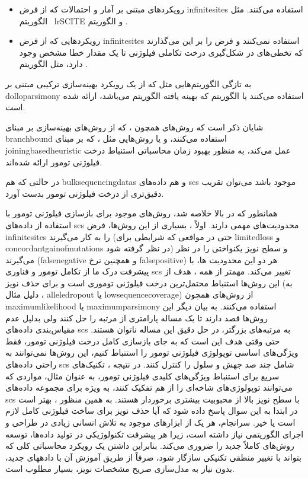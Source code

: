  \begin{itemize}
 	\item رویکردهای مبتنی بر آمار و احتمالات که از فرض \gls{infinitesites}  استفاده می‌کنند. مثل الگوریتم \ lr{SCITE}  \cite{jahn2016tree} و الگوریتم   \cite{ross2016onconem}. 
\item رویکردهایی که از فرض \gls{infinitesites} استفاده نمی‌کنند و فرض را بر این می‌گذارند که تخطی‌های در شکل‌گیری درخت تکاملی فیلوژنی تا یک مقدار خطا مشخص وجود دارد، مثل الگوریتم  \cite{zafar2017sifit}.  
 \end{itemize}


به تازگی الگوریتم‌هایی مثل  که از یک رویکرد بهینه‌سازی ترکیبی مبتنی بر \gls{dolloparsimony} استفاده می‌کنند یا الگوریتم   که بهینه یافته الگوریتم  می‌باشد، ارائه شده است. \cite{el2018sphyr, zafar2019siclonefit}

شایان ذکر است که روش‌های همچون  ، که از روش‌های بهینه‌سازی بر مبنای \gls{branchbound} استفاده می‌کنند، و یا روش‌هایی مثل ، که بر مبنای \gls{joiningbasedheuristic} عمل می‌کند، به منظور بهبود زمان محاسباتی استنباط درخت فیلوژنی تومور ارائه شده‌اند. \cite{sadeqi2020phiscs, wu2020accurate}

در حالتی که هم \glspl{bulksequencingdata} و هم داده‌های \gls{scs} موجود باشد می‌توان تقریب دقیق‌تری از درخت فیلوژنی  تومور بدست آورد. \cite{malikic2019integrative, malikic2019phiscs}

همانطور که در بالا خلاصه شد، روش‌های موجود برای بازسازی فیلوژنی تومور با استفاده از داده‌های \gls{scs} محدودیت‌های مهمی دارند. اولاً ، بسیاری از این روش‌ها، فرض \gls{infinitesites} را به کار می‌گیرند (حتی در مواقعی که شرایطی برای \gls{limitedloss} و \gls{concordantgainofmutations}  در نظر گرفته شود) و سطح نویز یکنواختی را در نظر می‌گیرند (\gls{falsenegative} و همچنین نرخ \gls{falsepositive})  هر دو این محدودیت ها، با پیشرفت درک ما از تکامل تومور و فناوری \gls{scs}  تغییر می‌کند. مهمتر از همه ، هدف از این روش‌ها استنباط محتمل‌ترین درخت فیلوژنی توموری است و برای حذف نویز (به دلیل مثال ، \gls{alleledropout} یا \gls{lowsequencecoverage}) از روش‌های همچون \gls{maximumlikelihood} یا \gls{maximumparsimony} استفاده می‌کنند. به بیان دیگر این روش‌ها قصد دارند تا یک مساله پارامتری از مرتبه  را حل کنند ولی بدلیل  عدم مقیاس‌بندی داده‌های \gls{scs} به مرتبه‌های بزرگتر، در حل دقیق این مساله ناتوان هستند. حتی وقتی هدف این است که به جای بازسازی کامل درخت فیلوژنی تومور، فقط ویژگی‌های اساسی توپولوژی فیلوژنی تومور را استنباط کنیم، این روش‌ها نمی‌توانند به راحتی داده‌های \gls{scs} شامل چند صد جهش و سلول را کنترل کنند. در نتیجه ، تکنیک‌های سریع برای استنباط ویژگی‌های کلیدی فیلوژنی تومور، به عنوان مثال، مواردی که می‌توانند توپولوژی‌های شاخه‌ای را از هم تفکیک کنند، به ویژه برای مجموعه داده‌های \gls{scs} با سطح نویز بالا از محبوبیت بیشتری برخوردار هستند. به همین منظور ، بهتر است در ابتدا به این سوال پاسخ داده شود که آیا حذف نویز  برای ساخت فیلوژنی کامل لازم است یا خیر. سرانجام، هر یک از ابزارهای موجود به تلاش انسانی زیادی در طراحی و اجرای الگوریتمی نیاز داشته است، زیرا هر پیشرفت تکنولوژیکی در تولید داده‌ها، توسعه روش‌های کاملاً جدید را ضروری می‌کند. بنابراین داشتن یک رویکرد محاسباتی کلی که بتواند با تغییر منطقی تکنیکی سازگار شود، صرفاً از طریق آموزش آن با دادههای جدید، بدون نیاز به مدل‌سازی صریح مشخصات نویز، بسیار مطلوب است.


